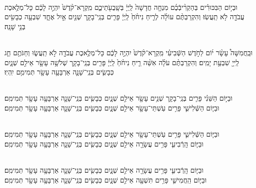 \documentclass[twoside, openany, parskip=half, 11pt]{book}
\begin{document}
\\
 וּבְי֣וֹם הַבִּכּוּרִ֗ים בְּהַקְרִ֨יבְֿכֶ֜ם מִנְחָ֤ה חֲדָשָׁה֙ לַֽיְיָ֔ בְּשָֽׁבֻעֹ֖תֵיכֶ֑ם מִֽקְרָא־קֹ֨דֶשׁ֙ יִהְיֶ֣ה לָכֶ֔ם כָּל־מְלֶ֥אכֶת עֲבֹדָ֖ה לֹ֥א תַֽעֲשֽׂוּ׃ וְהִקְרַבְתֶּ֨ם עוֹלָ֜ה לְרֵ֤יחַ נִיחֹ֨חַ֙ לַֽיְיָ֔ פָּרִ֧ים בְּנֵֽי־בָקָ֛ר שְׁנַ֖יִם אַ֣יִל אֶחָ֑ד שִׁבְעָ֥ה כְבָשִׂ֖ים בְּנֵ֥י שָׁנָֽה׃
 
\clearpage

\vspace{-\baselineskip}
\\
וּבַֽחֲמִשָּׁה֩ עָשָׂ֨ר י֜וֹם לַחֹ֣דֶשׁ הַשְּֿׁבִיעִ֗י מִֽקְרָא־קֹ֨דֶשׁ֙ יִהְיֶ֣ה לָכֶ֔ם כָּל־מְלֶ֥אכֶת עֲבֹדָ֖ה לֹ֣א תַֽעֲשׂ֑וּ וְחַגֹּתֶ֥ם חַ֛ג לַֽייָ֖ שִׁבְעַ֥ת יָמִֽים׃ וְהִקְרַבְתֶּ֨ם עֹלָ֜ה אִשֵּׁ֨ה רֵ֤יחַ נִיחֹ֨חַ֙ לַֽיְיָ֔ פָּרִ֧ים בְּנֵֽי־בָקָ֛ר שְׁלֹשָׁ֥ה עָשָׂ֖ר אֵילִ֣ם שְׁנָ֑יִם כְּבָשִׂ֧ים בְּנֵֽי־שָׁנָ֛ה אַרְבָּעָ֥ה עָשָׂ֖ר תְּמִימִ֥ם יִֽהְיֽוּ׃



\\
 וּבַיּ֣וֹם הַשֵּׁנִ֗י פָּרִ֧ים בְּנֵֽי־בָקָ֛ר שְׁנֵ֥ים עָשָׂ֖ר אֵילִ֣ם שְׁנָ֑יִם כְּבָשִׂ֧ים בְּנֵֽי־שָׁנָ֛ה אַרְבָּעָ֥ה עָשָׂ֖ר תְּמִימִֽם׃
\\
וּבַיּ֧וֹם הַשְּֿׁלִישִׁ֛י פָּרִ֥ים עַשְׁתֵּי־עָשָׂ֖ר אֵילִ֣ם שְׁנָ֑יִם כְּבָשִׂ֧ים בְּנֵֽי־שָׁנָ֛ה אַרְבָּעָ֥ה עָשָׂ֖ר תְּמִימִֽם׃



\\
וּבַיּ֧וֹם הַשְּֿׁלִישִׁ֛י פָּרִ֥ים עַשְׁתֵּי־עָשָׂ֖ר אֵילִ֣ם שְׁנָ֑יִם כְּבָשִׂ֧ים בְּנֵֽי־שָׁנָ֛ה אַרְבָּעָ֥ה עָשָׂ֖ר תְּמִימִֽם׃	
\\
 וּבַיּ֧וֹם הָֽרְֿבִיעִ֛י פָּרִ֥ים עֲשָׂרָ֖ה אֵילִ֣ם שְׁנָ֑יִם כְּבָשִׂ֧ים בְּנֵֽי־שָׁנָ֛ה אַרְבָּעָ֥ה עָשָׂ֖ר תְּמִימִֽם׃ 



\\
וּבַיּ֧וֹם הָֽרְֿבִיעִ֛י פָּרִ֥ים עֲשָׂרָ֖ה אֵילִ֣ם שְׁנָ֑יִם כְּבָשִׂ֧ים בְּנֵֽי־שָׁנָ֛ה אַרְבָּעָ֥ה עָשָׂ֖ר תְּמִימִֽם׃ 
\\
 וּבַיּ֧וֹם הַֽחֲמִישִׁ֛י פָּרִ֥ים תִּשְׁעָ֖ה אֵילִ֣ם שְׁנָ֑יִם כְּבָשִׂ֧ים בְּנֵֽי־שָׁנָ֛ה אַרְבָּעָ֥ה עָשָׂ֖ר תְּמִימִֽם׃ 
\end{document}
